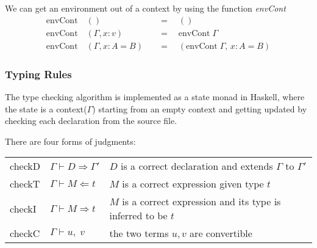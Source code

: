 \documentclass{article}
\theoremstyle{remark}
\begin{document}
We can get an environment out of a context by using the function \textit{envCont}
\begin{align*}
  \text{envCont} \quad () \quad &= \quad () \\
  \text{envCont} \quad (\Gamma, x : v) \quad &= \quad \text{envCont}\;\Gamma \\
  \text{envCont} \quad (\Gamma, x : A = B) \quad &= \quad (\text{envCont}\;\Gamma,\, x : A = B)
\end{align*}

\subsubsection{Typing Rules}
The type checking algorithm is implemented as a state monad in Haskell, where the state is a context($\Gamma$) starting from an empty context and getting updated by checking each declaration from the source file.

There are four forms of judgments:
\begin{table}[h]
  \centering
  \begin{tabular}{l l l}
    checkD & $\Gamma \vdash D \Rightarrow \Gamma'$ & $D$ is a correct declaration and extends $\Gamma$ to $\Gamma'$ \\
    checkT & $\Gamma \vdash M \Leftarrow t $ & $M$ is a correct expression given type $t$ \\
    checkI & $\Gamma \vdash M \Rightarrow t$ & $M$ is a correct expression and its type is inferred to be $t$ \\
    checkC & $\Gamma \vdash u,\; v$ & the two terms $u, v$ are convertible
  \end{tabular}
\end{table}




\end{document}
